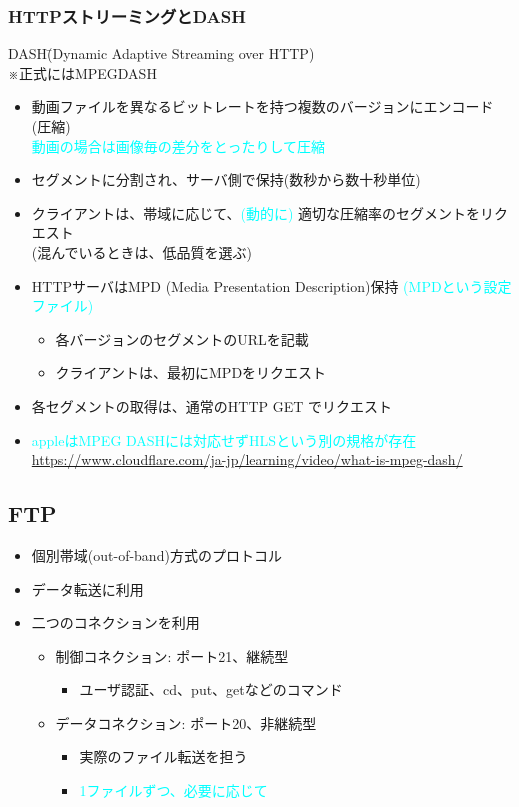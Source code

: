 \newpage
\subsubsection{HTTPストリーミングとDASH}

\begin{tabbing}
  DASH\= (Dynamic Adaptive Streaming over HTTP)\\
  \>※正式にはMPEGDASH
\end{tabbing}

\begin{itemize}
  \item 動画ファイルを異なるビットレートを持つ複数のバージョンにエンコード(圧縮)\\
    \textcolor{cyan}{動画の場合は画像毎の差分をとったりして圧縮}
  \item セグメントに分割され、サーバ側で保持(数秒から数十秒単位)
  \item クライアントは、帯域に応じて、\textcolor{cyan}{(動的に)} 適切な圧縮率のセグメントをリクエスト\\
    (混んでいるときは、低品質を選ぶ)
  \item HTTPサーバはMPD (Media Presentation Description)保持 \textcolor{cyan}{(MPDという設定ファイル)}
  \begin{itemize}
    \item 各バージョンのセグメントのURLを記載
    \item クライアントは、最初にMPDをリクエスト
  \end{itemize}
  \item 各セグメントの取得は、通常のHTTP GET でリクエスト
  \item \textcolor{cyan}{appleはMPEG DASHには対応せずHLSという別の規格が存在\\
    \url{https://www.cloudflare.com/ja-jp/learning/video/what-is-mpeg-dash/}
  }
\end{itemize}


\subsection{FTP}

\begin{itemize}
  \item 個別帯域(out-of-band)方式のプロトコル
  \item データ転送に利用
  \item 二つのコネクションを利用
  \begin{itemize}
    \item 制御コネクション: ポート21、継続型
    \begin{itemize}
      \item ユーザ認証、cd、put、getなどのコマンド
    \end{itemize}
    \item データコネクション: ポート20、非継続型
    \begin{itemize}
      \item 実際のファイル転送を担う
      \item \textcolor{cyan}{1ファイルずつ、必要に応じて}
    \end{itemize}
  \end{itemize}
\end{itemize}

